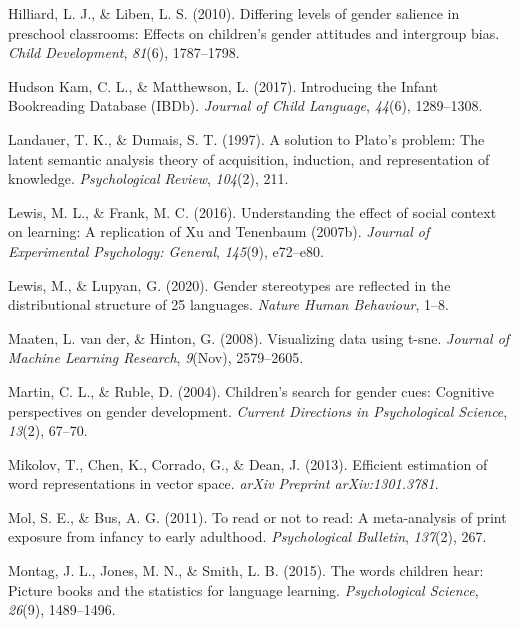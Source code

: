 \documentclass[
  english,
  ,man,floatsintext]{apa6}
\begin{document}
\leavevmode\hypertarget{ref-hilliard2010differing}{}%
Hilliard, L. J., \& Liben, L. S. (2010). Differing levels of gender salience in preschool classrooms: Effects on children's gender attitudes and intergroup bias. \emph{Child Development}, \emph{81}(6), 1787--1798.

\leavevmode\hypertarget{ref-kam_2017}{}%
Hudson Kam, C. L., \& Matthewson, L. (2017). Introducing the Infant Bookreading Database (IBDb). \emph{Journal of Child Language}, \emph{44}(6), 1289--1308.

\leavevmode\hypertarget{ref-landauer1997solution}{}%
Landauer, T. K., \& Dumais, S. T. (1997). A solution to Plato's problem: The latent semantic analysis theory of acquisition, induction, and representation of knowledge. \emph{Psychological Review}, \emph{104}(2), 211.

\leavevmode\hypertarget{ref-lewis2016understanding}{}%
Lewis, M. L., \& Frank, M. C. (2016). Understanding the effect of social context on learning: A replication of Xu and Tenenbaum (2007b). \emph{Journal of Experimental Psychology: General}, \emph{145}(9), e72--e80.

\leavevmode\hypertarget{ref-lewis2020}{}%
Lewis, M., \& Lupyan, G. (2020). Gender stereotypes are reflected in the distributional structure of 25 languages. \emph{Nature Human Behaviour}, 1--8.

\leavevmode\hypertarget{ref-maaten2008visualizing}{}%
Maaten, L. van der, \& Hinton, G. (2008). Visualizing data using t-sne. \emph{Journal of Machine Learning Research}, \emph{9}(Nov), 2579--2605.

\leavevmode\hypertarget{ref-martin2004children}{}%
Martin, C. L., \& Ruble, D. (2004). Children's search for gender cues: Cognitive perspectives on gender development. \emph{Current Directions in Psychological Science}, \emph{13}(2), 67--70.

\leavevmode\hypertarget{ref-mikolov2013efficient}{}%
Mikolov, T., Chen, K., Corrado, G., \& Dean, J. (2013). Efficient estimation of word representations in vector space. \emph{arXiv Preprint arXiv:1301.3781}.

\leavevmode\hypertarget{ref-mol2011read}{}%
Mol, S. E., \& Bus, A. G. (2011). To read or not to read: A meta-analysis of print exposure from infancy to early adulthood. \emph{Psychological Bulletin}, \emph{137}(2), 267.

\leavevmode\hypertarget{ref-montag2015words}{}%
Montag, J. L., Jones, M. N., \& Smith, L. B. (2015). The words children hear: Picture books and the statistics for language learning. \emph{Psychological Science}, \emph{26}(9), 1489--1496.
\end{document}
